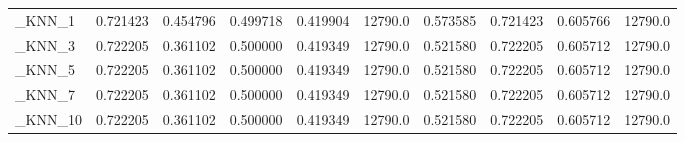 \begin{tabular}{lrrrrrrrrr}
\_KNN\_1                                             &  0.721423 &         0.454796 &      0.499718 &        0.419904 &        12790.0 &            0.573585 &         0.721423 &           0.605766 &           12790.0 \\
\_KNN\_3                                             &  0.722205 &         0.361102 &      0.500000 &        0.419349 &        12790.0 &            0.521580 &         0.722205 &           0.605712 &           12790.0 \\
\_KNN\_5                                             &  0.722205 &         0.361102 &      0.500000 &        0.419349 &        12790.0 &            0.521580 &         0.722205 &           0.605712 &           12790.0 \\
\_KNN\_7                                             &  0.722205 &         0.361102 &      0.500000 &        0.419349 &        12790.0 &            0.521580 &         0.722205 &           0.605712 &           12790.0 \\
\_KNN\_10                                            &  0.722205 &         0.361102 &      0.500000 &        0.419349 &        12790.0 &            0.521580 &         0.722205 &           0.605712 &           12790.0 \\
\bottomrule
\end{tabular}
